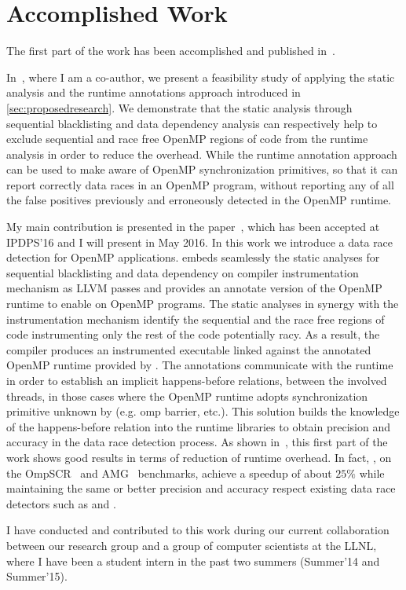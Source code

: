 \section{Accomplished Work}
\label{sec:accomplishedwork}

The first part of the work has been accomplished and published
in~\cite{Protze:2014:TPL:2688361.2688369, atzeni2016}.

In~\cite{Protze:2014:TPL:2688361.2688369}, where I am a co-author, we present
a feasibility study of applying the static analysis and the runtime
annotations approach introduced in \cref{sec:proposedresearch}.
%
We demonstrate that the static analysis through sequential blacklisting and
data dependency analysis can respectively help to exclude sequential and race
free OpenMP regions of code from the runtime analysis in order to reduce the
overhead.
%
While the runtime annotation approach can be used to make \tsan aware of
OpenMP synchronization primitives, so that it can report correctly data races
in an OpenMP program, without reporting any of all the false positives
previously and erroneously detected in the OpenMP runtime.

My main contribution is presented in the paper~\cite{atzeni2016}, which has
been accepted at IPDPS'16 and I will present in May 2016.
%
In this work we introduce \archer a data race detection for OpenMP applications.
%
\archer embeds seamlessly the static analyses for sequential blacklisting and
data dependency on \tsan compiler instrumentation mechanism as LLVM passes and
provides an annotate version of the OpenMP runtime to enable \tsan on OpenMP
programs.
%
The static analyses in synergy with the instrumentation mechanism identify the
sequential and the race free regions of code instrumenting only the rest of
the code potentially racy.
%
As a result, the compiler produces an instrumented executable linked against
the annotated OpenMP runtime provided by \archer.
%
The annotations communicate with the \tsan runtime in order to establish an
implicit happens-before relations, between the involved threads, in those
cases where the OpenMP runtime adopts synchronization primitive unknown by
\tsan (e.g. omp barrier, etc.).
%
This solution builds the knowledge of the happens-before relation into the
runtime libraries to obtain precision and accuracy in the data race detection
process.
%
As shown in~\cite{atzeni2016}, this first part of the work shows good results
in terms of reduction of runtime overhead.
%
In fact, \archer, on the OmpSCR~\cite{ompscr} and AMG~\cite{amg2013}
benchmarks, achieve a speedup of about $25\%$ while maintaining the same or
better precision and accuracy respect existing data race detectors such as
\insp and \tsan.

I have conducted and contributed to this work during our current collaboration
between our research group and a group of computer scientists at the LLNL,
where I have been a student intern in the past two summers (Summer'14 and
Summer'15).

